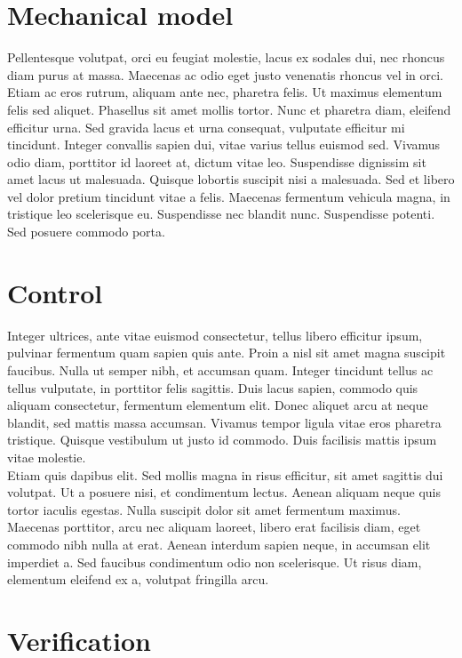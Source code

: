 \documentclass[a4paper, 11pt] {article}
\begin{document}
\section{Mechanical model}

Pellentesque volutpat, orci eu feugiat molestie, lacus ex sodales dui, nec rhoncus diam purus at massa. Maecenas ac odio eget justo venenatis rhoncus vel in orci. Etiam ac eros rutrum, aliquam ante nec, pharetra felis. Ut maximus elementum felis sed aliquet. Phasellus sit amet mollis tortor. Nunc et pharetra diam, eleifend efficitur urna. Sed gravida lacus et urna consequat, vulputate efficitur mi tincidunt. Integer convallis sapien dui, vitae varius tellus euismod sed. Vivamus odio diam, porttitor id laoreet at, dictum vitae leo. Suspendisse dignissim sit amet lacus ut malesuada. Quisque lobortis suscipit nisi a malesuada. Sed et libero vel dolor pretium tincidunt vitae a felis. Maecenas fermentum vehicula magna, in tristique leo scelerisque eu. Suspendisse nec blandit nunc. Suspendisse potenti. Sed posuere commodo porta. 




\section{Control}

 Integer ultrices, ante vitae euismod consectetur, tellus libero efficitur ipsum, pulvinar fermentum quam sapien quis ante. Proin a nisl sit amet magna suscipit faucibus. Nulla ut semper nibh, et accumsan quam. Integer tincidunt tellus ac tellus vulputate, in porttitor felis sagittis. Duis lacus sapien, commodo quis aliquam consectetur, fermentum elementum elit. Donec aliquet arcu at neque blandit, sed mattis massa accumsan. Vivamus tempor ligula vitae eros pharetra tristique. Quisque vestibulum ut justo id commodo. Duis facilisis mattis ipsum vitae molestie.
\\
Etiam quis dapibus elit. Sed mollis magna in risus efficitur, sit amet sagittis dui volutpat. Ut a posuere nisi, et condimentum lectus. Aenean aliquam neque quis tortor iaculis egestas. Nulla suscipit dolor sit amet fermentum maximus. Maecenas porttitor, arcu nec aliquam laoreet, libero erat facilisis diam, eget commodo nibh nulla at erat. Aenean interdum sapien neque, in accumsan elit imperdiet a. Sed faucibus condimentum odio non scelerisque. Ut risus diam, elementum eleifend ex a, volutpat fringilla arcu. 


\section{Verification}
\end{document}
